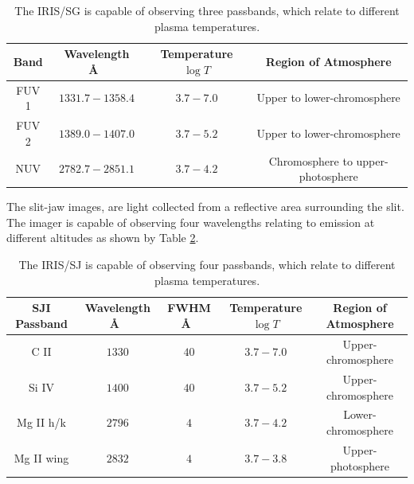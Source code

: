 \begin{table}[H]
\centering
\begin{tabular}{|c|c|c|c|}
Band & Wavelength \AA\ & Temperature $\log{T}$ & Region of Atmosphere\\
\hline
FUV 1 & $1331.7 - 1358.4$ & $3.7 - 7.0$ & Upper to lower-chromosphere\\
FUV 2 & $1389.0 - 1407.0$ & $3.7 - 5.2$ & Upper to lower-chromosphere\\
NUV & $2782.7 - 2851.1$ & $3.7 - 4.2$ & Chromosphere to upper-photosphere\\
\end{tabular}
\caption{The IRIS/SG is capable of observing three passbands, which relate to different plasma temperatures.}\label{iris-sg}
\end{table}


The slit-jaw images, are light collected from a reflective area surrounding the slit. The imager is capable of observing four wavelengths relating to emission at different altitudes as shown by Table \ref{iris-sj}.

\begin{table}[H]
\centering
\begin{tabular}{|c|c|c|c|c|}
SJI Passband & Wavelength \AA\ & FWHM \AA\ & Temperature $\log{T}$ & Region of Atmosphere\\
\hline
C II  & $1330$ & $40$ & $3.7 - 7.0$ & Upper-chromosphere\\
Si IV  & $1400$ & $40$ & $3.7 - 5.2$ & Upper-chromosphere\\
Mg II h/k & $2796$ & $4$ & $3.7 - 4.2$ & Lower-chromosphere\\
Mg II wing & $2832$ & $4$ & $3.7 - 3.8$ & Upper-photosphere\\
\end{tabular}
\caption{The IRIS/SJ is capable of observing four passbands, which relate to different plasma temperatures.}\label{iris-sj}
\end{table}


